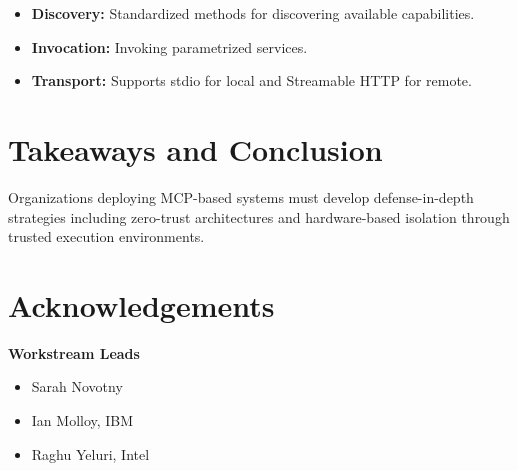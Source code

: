 \documentclass[11pt]{article}
\begin{document}
\begin{itemize}
    \item{} \textbf{Discovery:} Standardized methods for discovering available capabilities.
    \item{} \textbf{Invocation:} Invoking parametrized services.
    \item{} \textbf{Transport:} Supports stdio for local and Streamable HTTP for remote.
\end{itemize}

\section{Takeaways and Conclusion}
Organizations deploying MCP-based systems must develop defense-in-depth strategies including zero-trust architectures and hardware-based isolation through trusted execution environments.

\newpage
\section*{Acknowledgements}
\textbf{Workstream Leads}
\begin{itemize}
    \item{} Sarah Novotny
    \item{} Ian Molloy, IBM
    \item{} Raghu Yeluri, Intel
\end{itemize}
\end{document}
